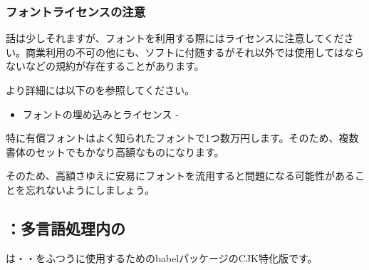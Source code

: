 \documentclass[../supplement]{subfiles}
\begin{document}
\begin{texsource}
\usepackage[noalphabet, haranoaji]{pxchfon}
\end{texsource}

\subsubsection{フォントライセンスの注意}

話は少しそれますが、フォントを利用する際にはライセンスに注意してください。商業利用の不可の他にも、ソフトに付随するがそれ以外では使用してはならないなどの規約が存在することがあります。

より詳細には以下の{\TeXWiki}を参照してください。

\begin{itemize}
  \item フォントの埋め込みとライセンス - {\TeXWiki}
\end{itemize}

特に有償フォントはよく知られたフォントで1つ数万円します。そのため、複数書体のセットでもかなり高額なものになります。

そのため、高額さゆえに安易にフォントを流用すると問題になる可能性があることを忘れないようにしましょう。

\subsection{\texorpdfstring{}{pxbabelパッケージ}：多言語処理内の\texorpdfstring{}{UTF}}

は・・をふつうに使用するためのbabelパッケージのCJK特化版です。

\subsection{\texorpdfstring{}{pxjahyperパッケージ}}
\end{document}
